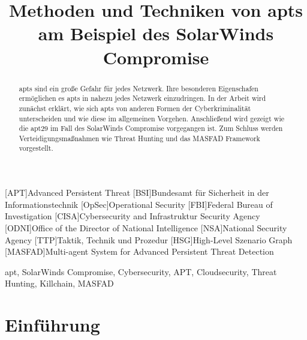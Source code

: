 \documentclass[conference]{IEEEtran}
\begin{document}
\begin{acronym}
    [APT]{Advanced Persistent Threat}
    [BSI]{Bundesamt für Sicherheit in der Informationstechnik}
    [OpSec]{Operational Security}
    [FBI]{Federal Bureau of Investigation}
    [CISA]{Cybersecurity and Infrastruktur Security Agency}
    [ODNI]{Office of the Director of National Intelligence}
    [NSA]{National Security Agency}
    [TTP]{Taktik, Technik und Prozedur}
    [HSG]{High-Level Szenario Graph}
    [MASFAD]{Multi-agent System for Advanced Persistent Threat Detection}
\end{acronym}


\title{Methoden und Techniken von \aclp*{apt} am Beispiel des SolarWinds Compromise
}

\author{
}

\maketitle

\begin{abstract}
    \acp{apt} sind ein große Gefahr für jedes Netzwerk. Ihre besonderen Eigenschafen ermöglichen es \acp{apt} in nahezu jedes Netzwerk einzudringen.
    In der Arbeit wird zunächst erklärt, wie sich \acp{apt} von anderen Formen der Cyberkriminalität unterscheiden und wie diese im allgemeinen Vorgehen.
    Anschließend wird gezeigt wie die \ac{apt}29 im Fall des SolarWinds Compromise vorgegangen ist.
    Zum Schluss werden Verteidigungsmaßnahmen wie Threat Hunting und das MASFAD Framework vorgestellt.
\end{abstract}

\begin{IEEEkeywords}
    \ac{apt}, SolarWinds Compromise, Cybersecurity, APT, Cloudsecurity, Threat Hunting, Killchain, MASFAD
\end{IEEEkeywords}

\section{Einführung}
\label{sec:introduction}
\end{document}
